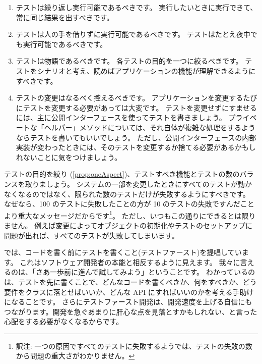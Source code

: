 \documentclass[a4paper,10pt,twoside]{book}
\begin{document}
\begin{enumerate}
\item テストは繰り返し実行可能であるべきです。
  実行したいときに実行できて、常に同じ結果を出すべきです。

\item テストは人の手を借りずに実行可能であるべきです。
  テストはたとえ夜中でも実行可能であるべきです。

\item テストは物語であるべきです。
  各テストの目的を一つに絞るべきです。
  テストをシナリオと考え、読めばアプリケーションの機能が理解できるようにすべきです。\label{prop:oneAspect}

\item テストの変更はなるべく控えるべきです。
  アプリケーションを変更するたびにテストを変更する必要があっては大変です。
  テストを変更せずにすませるには、主に公開インターフェースを使ってテストを書きましょう。
  プライベートな「ヘルパー」メソッドについては、それ自体が複雑な処理をするようならテストを書いてもいいでしょう。
  ただし、公開インターフェースの内部実装が変わったときには、そのテストを変更するか捨てる必要があるかもしれないことに気をつけましょう。
\end{enumerate}

テストの目的を絞り (\ref{prop:oneAspect})、テストすべき機能とテストの数のバランスを取りましょう。
システムの一部を変更したときにすべてのテストが動かなくなるのではなく、限られた数のテストだけが失敗するようにすべきです。
なぜなら、100 のテストに失敗したことの方が 10 のテストの失敗ですんだことより重大なメッセージだからです\footnote{訳注: 一つの原因ですべてのテストに失敗するようでは、テストの失敗の数から問題の重大さがわかりません。}。%
ただし、いつもこの通りにできるとは限りません。
例えば変更によってオブジェクトの初期化やテストのセットアップに問題が出れば、すべてのテストが失敗してしまいます。

 では、コードを書く前にテストを書くこと(テストファースト)を提唱しています。
これはソフトウェア開発者の本能と相反するように見えます。
我々に言えるのは、「さあ一歩前に進んで試してみよう」ということです。 
わかっているのは、テストを先に書くことで、どんなコードを書くべきか、何をすべきか、どう要件をクラスに落とせばいいか、どんな API にすればいいのかを考える手助けになることです。
さらにテストファースト開発は、開発速度を上げる自信にもつながります。開発を急ぐあまりに肝心な点を見落とすかもしれない、と言った心配をする必要がなくなるからです。
\end{document}
